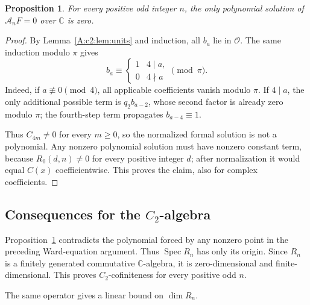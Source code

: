 \documentclass[11pt]{article}
\newtheorem{proposition}[theorem]{Proposition}
\newcommand{\C}{\mathbb C}\newcommand{\Q}{\mathbb Q}\newcommand{\Z}{\mathbb Z}
\newcommand{\Spec}{\operatorname{Spec}}\newcommand{\soc}{\operatorname{soc}}\newcommand{\ch}{\operatorname{ch}}
\numberwithin{equation}{section}
\begin{document}
\begin{proposition}\label{A:c2:prop:no-poly}
For every positive odd integer $n$, the only polynomial solution of $\mathcal A_nF=0$ over $\C$ is zero.
\end{proposition}
\begin{proof}
By Lemma~\ref{A:c2:lem:units} and induction, all $b_a$ lie in $\mathcal O$. The same induction modulo $\pi$ gives
\begin{equation}\label{A:c2:eq:key}
 \displaystyle b_a\equiv
 \begin{cases}1&4\mid a,\\0&4\nmid a\end{cases}\pmod\pi.
\end{equation}
Indeed, if $a\not\equiv0\pmod4$, all applicable coefficients vanish modulo $\pi$. If $4\mid a$, the only additional possible term is $q_2b_{a-2}$, whose second factor is already zero modulo $\pi$; the fourth-step term propagates $b_{a-4}\equiv1$.

Thus $C_{4m}\ne0$ for every $m\geq0$, so the normalized formal solution is not a polynomial. Any nonzero polynomial solution must have nonzero constant term, because $R_0(d,n)\ne0$ for every positive integer $d$; after normalization it would equal $C(x)$ coefficientwise. This proves the claim, also for complex coefficients.
\end{proof}

\subsection{Consequences for the $C_2$-algebra}
Proposition~\ref{A:c2:prop:no-poly} contradicts the polynomial forced by any nonzero point in the preceding Ward-equation argument. Thus $\Spec R_n$ has only its origin. Since $R_n$ is a finitely generated commutative $\C$-algebra, it is zero-dimensional and finite-dimensional. This proves $C_2$-cofiniteness for every positive odd $n$.

The same operator gives a linear bound on $\dim R_n$.
\end{document}
